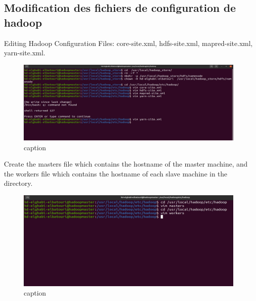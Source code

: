 \begin{spacing}{1.2}
\section{Modification des fichiers de configuration de hadoop}

\par Editing Hadoop Configuration Files: core-site.xml, hdfs-site.xml, mapred-site.xml, yarn-site.xml. 
\\
\begin{figure}[!htb] 
\begin{center} 
\includegraphics[width=1\linewidth]{Big_Data/Hadoop/Multi-Nodes Cluster/Modifying Hadoop config files.jpg} 
\end{center} 
\caption{caption} 
\end{figure} 
\FloatBarrier



\par Create the masters file which contains the hostname of the master machine, and the workers file which contains the hostname of each slave machine in the directory.
\\
\begin{figure}[!htb] 
\begin{center} 
\includegraphics[width=1\linewidth]{Big_Data/Hadoop/Multi-Nodes Cluster/Master and Workers.jpg} 
\end{center} 
\caption{caption} 
\end{figure} 
\FloatBarrier


\end{spacing}
